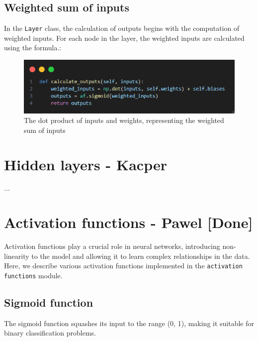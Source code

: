 \documentclass{article}
\begin{document}
\subsection{Weighted sum of inputs}
In the \texttt{Layer} class, the calculation of outputs begins with the computation of weighted inputs. For each node in the layer, the weighted inputs are calculated using the formula.:
\begin{figure}[ht]
    \centering
    \includegraphics[width=1\textwidth]{images/dot-product-of-inputs-and-weights.png}
    \caption{The dot product of inputs and weights, representing the weighted sum of inputs}
    \label{fig:weighted_sum}
\end{figure}

\newpage
\section{Hidden layers - Kacper}
...

\newpage
\section{Activation functions - Pawel [Done]}
Activation functions play a crucial role in neural networks, introducing non-linearity to the model and allowing it to learn complex relationships in the data. Here, we describe various activation functions implemented in the \texttt{activation functions} module.

\subsection{Sigmoid function}
The sigmoid function squashes its input to the range (0, 1), making it suitable for binary classification problems.
\end{document}

